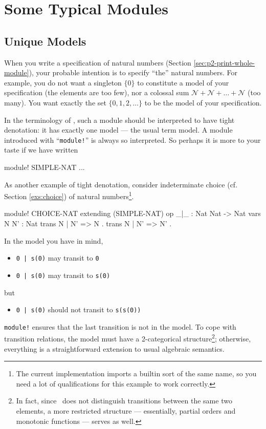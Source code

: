 \documentclass[a4paper]{memoir}
\begin{document}
\section{Some Typical Modules}\label{sec:p2-typical-modules}

\subsection{Unique Models}\label{sec:p2-unique-model}

When you write a specification of natural numbers (Section
\ref{sec:p2-print-whole-module}), your probable intention is
to specify ``the'' natural numbers. For example, you do not
want a singleton $\{ 0 \}$ to constitute a model of
your specification (the elements are too few), nor a colossal
sum $\mathcal{N} + \mathcal{N} + \ldots + \mathcal{N}$ (too many).
You want exactly the set $\{ 0, 1, 2, \ldots \}$ to be the
model of your specification.

In the terminology of \cafeobj, such a module should be interpreted to have
tight denotation: it has exactly one model --- the usual term
model. A module introduced with ``\verb|module!|'' is always so interpreted.
So perhaps it is more to your taste if we have written
\begin{vvtm}
\begin{ccode}
  module! SIMPLE-NAT {
  ...
  }
\end{ccode}
\end{vvtm}
As another example of tight denotation, consider indeterminate
choice (cf. Section \ref{exs:choice}) of natural numbers\footnote{
The current implementation imports a
builtin sort of the same name, so you need a lot of qualifications
for this example to work correctly.

}.
\label{exs:choice-nat}
\begin{vvtm}
\begin{ccode}
  module! CHOICE-NAT {
    extending (SIMPLE-NAT)
    op _|_ : Nat Nat -> Nat
    vars N N' : Nat
    trans N | N' => N .
    trans N | N' => N' .
  }
\end{ccode}
\end{vvtm}
In the model you have in mind,
\begin{itemize}
\item[] \verb+0 | s(0)+ may transit to \verb|0|
\item[] \verb+0 | s(0)+ may transit to \verb|s(0)|
\end{itemize}
but
\begin{itemize}
\item[] \verb+0 | s(0)+ should not transit to \verb|s(s(0))|
\end{itemize}
\verb|module!| ensures that the last transition is not in the model.
To cope with transition relations, the model must have a 2-categorical
structure\footnote{
In fact, since \cafeobj~does not distinguish transitions between the
same two elements, a more restricted structure --- essentially,
partial orders and monotonic functions --- serves as well.
}; otherwise, everything is a straightforward extension to usual
algebraic semantics.
\end{document}
